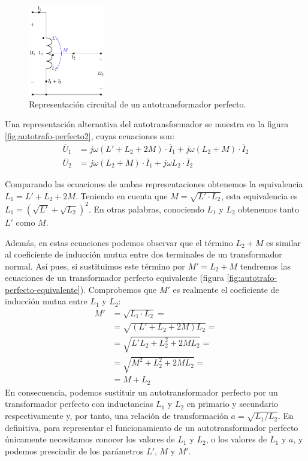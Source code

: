 \begin{figure}\centering
  \includegraphics[height=4cm]{../figs/AutotrafoPerfecto.pdf}
  \caption{Representación circuital de un autotransformador perfecto.}
  \label{fig:autotrafo-perfecto}
\end{figure}

Una representación alternativa del autotransformador se muestra en la figura \ref{fig:autotrafo-perfecto2}, cuyas ecuaciones son:
\begin{align*}
  \overline{U}_1 &= j \omega (L' + L_2 + 2M) \cdot \overline{I}_1 + j \omega (L_2 + M) \cdot \overline{I}_2\\
  \overline{U}_2 &= j \omega (L_2 + M) \cdot \overline{I}_1 + j \omega L_2 \cdot \overline{I}_2
\end{align*}


Comparando las ecuaciones de ambas representaciones obtenemos la equivalencia $L_1 = L' + L_2 + 2M$. Teniendo en cuenta que $M = \sqrt{L' \cdot L_2}$, esta equivalencia es $L_1 = \left( \sqrt{L'} + \sqrt{L_2} \right)^2$. En otras palabras, conociendo $L_1$ y $L_2$ obtenemos tanto $L'$ como $M$.

Además, en estas ecuaciones podemos observar que el término $L_2 + M$ es similar al coeficiente de inducción mutua entre dos terminales de un transformador normal. Así pues, si sustituimos este término por $M' = L_2 + M$ tendremos las ecuaciones de un transformador perfecto equivalente (figura \ref{fig:autotrafo-perfecto-equivalente}). Comprobemos que $M'$ es realmente el coeficiente de inducción mutua entre $L_1$ y $L_2$:
  \begin{align*}
  M' &= \sqrt{L_1 \cdot L_2} = \\
     &= \sqrt{(L' + L_2 + 2M) L_2} =\\
     &= \sqrt{L'L_2 + L_2^2 + 2ML_2} =\\
     &= \sqrt{M^2 + L_2^2 + 2ML_2} = \\
     &= M + L_2
\end{align*}
En consecuencia, podemos sustituir un autotransformador perfecto por un transformador perfecto con inductancias $L_1$ y $L_2$ en primario y secundario respectivamente y, por tanto, una relación de transformación $a = \sqrt{L_1/L_2}$. En definitiva, para representar el funcionamiento de un autotransformador perfecto únicamente necesitamos conocer los valores de $L_1$ y $L_2$, o los valores de $L_1$ y $a$, y podemos prescindir de los parámetros $L'$, $M$ y $M'$.

